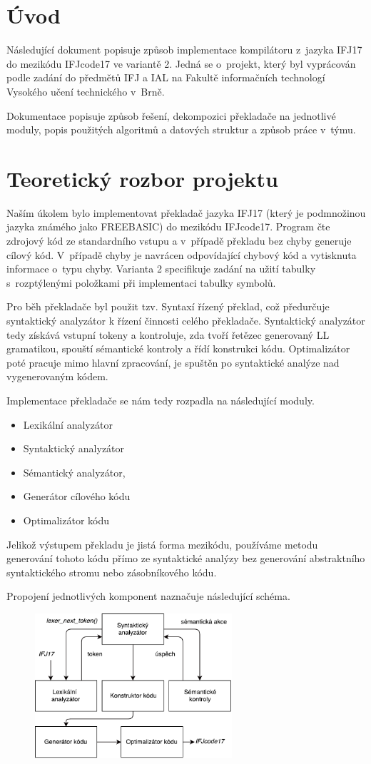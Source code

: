 \section{Úvod}
Následující dokument popisuje způsob implementace kompilátoru z~jazyka IFJ17 do mezikódu
IFJcode17 ve variantě 2. Jedná se o~projekt,
který byl vyprácován podle zadání do předmětů IFJ a IAL na Fakultě
informačních technologí Vysokého učení technického v~Brně.

Dokumentace popisuje způsob řešení, dekompozici překladače na jednotlivé moduly,
popis použitých algoritmů a datových struktur a způsob práce v~týmu.

\section{Teoretický rozbor projektu}
Naším úkolem bylo implementovat překladač jazyka IFJ17 (který je podmnožinou jazyka známého jako \mbox{FREEBASIC})
do mezikódu IFJcode17. Program čte zdrojový kód ze standardního vstupu a v~případě překladu bez chyby generuje cílový
kód. V~případě chyby je navrácen odpovídající chybový kód a vytisknuta informace o~typu chyby. Varianta 2 specifikuje
zadání na užití tabulky s~rozptýlenými položkami při implementaci tabulky symbolů.

Pro běh překladače byl použit tzv. Syntaxí řízený překlad, což předurčuje syntaktický analyzátor k řízení činnosti
celého překladače. Syntaktický analyzátor tedy získává vstupní tokeny a kontroluje, zda tvoří řetězec generovaný
LL gramatikou, spouští sémantické kontroly a řídí konstrukci kódu.
Optimalizátor poté pracuje mimo hlavní zpracování, je spuštěn po syntaktické analýze nad vygenerovaným kódem.

Implementace překladače se nám tedy rozpadla na následující moduly.


\begin{itemize}
    \item Lexikální analyzátor
    \item Syntaktický analyzátor
    \item Sémantický analyzátor,
    \item Generátor cílového kódu
    \item Optimalizátor kódu
\end{itemize}

Jelikož výstupem překladu je jistá forma mezikódu, používáme metodu generování tohoto kódu přímo ze syntaktické
analýzy bez generování abstraktního syntaktického stromu nebo zásobníkového kódu.

Propojení jednotlivých komponent naznačuje následující schéma.
\vspace*{4px}
\begin{figure}[htbp]
\centering
\includegraphics[width=0.65\textwidth, angle=0]{src/assets/structure.pdf}
\end{figure}